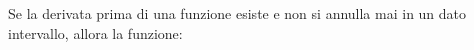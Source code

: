 Se la derivata prima di una funzione esiste e non si 
annulla mai in un dato intervallo, allora la funzione: 

